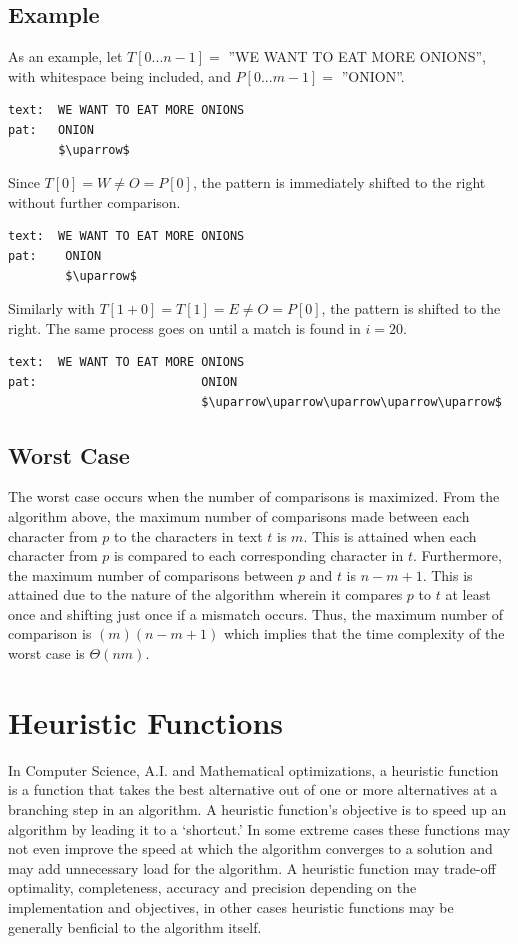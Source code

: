 \subsection{Example}
As an example, let $T[0...n-1]=$ ''WE WANT TO EAT MORE ONIONS'', with whitespace being included, and $P[0...m-1]=$ ''ONION''.


\begin{lstlisting}[mathescape=true, basicstyle=\LSTfont]
text:  WE WANT TO EAT MORE ONIONS
pat:   ONION
       $\uparrow$
\end{lstlisting}

Since $T[0] = W \neq O = P[0]$, the pattern is immediately shifted to the right without further comparison.

\begin{lstlisting}[mathescape=true, basicstyle=\LSTfont]
text:  WE WANT TO EAT MORE ONIONS
pat:    ONION
        $\uparrow$
\end{lstlisting}

Similarly with $T[1+0] = T[1] = E \neq O = P[0]$, the pattern is shifted to the right. The same process goes on until a match is found in $i=20$.

\begin{lstlisting}[mathescape=true, basicstyle=\LSTfont]
text:  WE WANT TO EAT MORE ONIONS
pat:                       ONION
                           $\uparrow\uparrow\uparrow\uparrow\uparrow$
\end{lstlisting}

\subsection{Worst Case}\cite{bfworst}    
The worst case occurs when the number of comparisons is maximized. From the algorithm above, the maximum number of comparisons made between each character from $p$ to the characters in text $t$ is $m$. This is attained when each character from $p$ is compared to each corresponding character in $t$. Furthermore, the maximum number of comparisons between $p$ and $t$ is $n-m+1$. This is attained due to the nature of the algorithm wherein it compares $p$ to $t$ at least once and shifting just once if a mismatch occurs. Thus, the maximum number of comparison is $(m)(n-m+1)$ which implies that the time complexity of the worst case is $\Theta(nm)$.

\section{Heuristic Functions}
In Computer Science, A.I. and Mathematical optimizations, a heuristic function is a function that takes the best alternative out of one or more alternatives at a branching step in an algorithm. A heuristic function's objective is to speed up an algorithm by leading it to a `shortcut.' In some extreme cases these functions may not even improve the speed at which the algorithm converges to a solution and may add unnecessary load for the algorithm. A heuristic function may trade-off optimality, completeness, accuracy and precision depending on the implementation and objectives, in other cases heuristic functions may be generally benficial to the algorithm itself. \\

